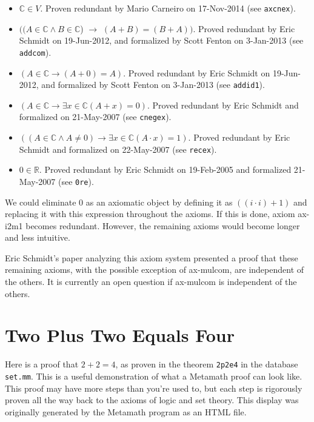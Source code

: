 \begin{itemize}
\item
  $\mathbb{C} \in V$.
  Proven redundant by Mario Carneiro on
  17-Nov-2014 (see \texttt{axcnex}).
\item
  $((A \in \mathbb{C} \land B \in \mathbb{C}$) $\rightarrow$
  $(A + B) = (B + A))$.
  Proved redundant by Eric Schmidt on 19-Jun-2012,
  and formalized by Scott Fenton on 3-Jan-2013
  (see \texttt{addcom}).
\item
  $(A \in \mathbb{C} \rightarrow (A + 0) = A)$.
  Proved redundant by Eric Schmidt on 19-Jun-2012,
  and formalized by Scott Fenton on 3-Jan-2013
  (see \texttt{addid1}).
\item
  $(A \in \mathbb{C} \rightarrow \exists x \in \mathbb{C} (A + x) = 0)$.
  Proved redundant by Eric Schmidt and formalized on 21-May-2007
  (see \texttt{cnegex}).
\item
  $((A \in \mathbb{C} \land A \ne 0) \rightarrow \exists x \in \mathbb{C} (A \cdot x) = 1)$.
  Proved redundant by Eric Schmidt and formalized on 22-May-2007
  (see \texttt{recex}).
\item
  $0 \in \mathbb{R}$.
  Proved redundant by Eric Schmidt on 19-Feb-2005 and formalized 21-May-2007
  (see \texttt{0re}).
\end{itemize}

We could eliminate 0 as an axiomatic object by defining it as
$( ( i \cdot i ) + 1 )$
and replacing it with this expression throughout the axioms. If this
is done, axiom ax-i2m1 becomes redundant. However, the remaining axioms
would become longer and less intuitive.

Eric Schmidt's paper analyzing this axiom system \cite{Schmidt}
presented a proof that these remaining axioms,
with the possible exception of ax-mulcom, are independent of the others.
It is currently an open question if ax-mulcom is independent of the others.

\section{Two Plus Two Equals Four}\label{2p2e4}

Here is a proof that $2 + 2 = 4$, as proven in the theorem \texttt{2p2e4}
in the database \texttt{set.mm}.
This is a useful demonstration of what a Metamath proof can look like.
This proof may have more steps than you're used to, but each step is rigorously
proven all the way back to the axioms of logic and set theory.
This display was originally generated by the Metamath program
as an HTML file.

